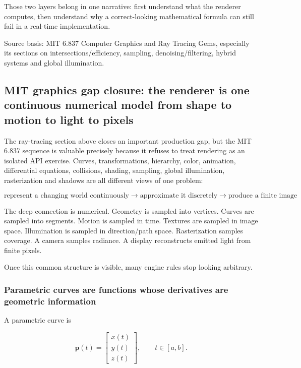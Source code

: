 Those two layers belong in one narrative: first understand what the renderer computes, then understand why a correct-looking mathematical formula can still fail in a real-time implementation.

Source basis: MIT 6.837 Computer Graphics and Ray Tracing Gems, especially its sections on intersections/efficiency, sampling, denoising/filtering, hybrid systems and global illumination.

\subsection{MIT graphics gap closure: the renderer is one continuous numerical model from shape to motion to light to pixels}\label{03-visual-computing-i-ch001-mit-graphics-gap-closure-the-renderer-is-one-continuous-numerical-model-from-shape-to-motion-to-light-to-pixels}

The ray-tracing section above closes an important production gap, but the MIT 6.837 sequence is valuable precisely because it refuses to treat rendering as an isolated API exercise. Curves, transformations, hierarchy, color, animation, differential equations, collisions, shading, sampling, global illumination, rasterization and shadows are all different views of one problem:

\[
\boxed{
\text{represent a changing world continuously}
\rightarrow
\text{approximate it discretely}
\rightarrow
\text{produce a finite image}
}
\]

The deep connection is numerical. Geometry is sampled into vertices. Curves are sampled into segments. Motion is sampled in time. Textures are sampled in image space. Illumination is sampled in direction/path space. Rasterization samples coverage. A camera samples radiance. A display reconstructs emitted light from finite pixels.

Once this common structure is visible, many engine rules stop looking arbitrary.

\subsubsection{Parametric curves are functions whose derivatives are geometric information}\label{03-visual-computing-i-ch001-parametric-curves-are-functions-whose-derivatives-are-geometric-information}

A parametric curve is

\[
\mathbf p(t)=
\begin{bmatrix}
x(t)\\
y(t)\\
z(t)
\end{bmatrix},
\qquad
t\in[a,b].
\]

